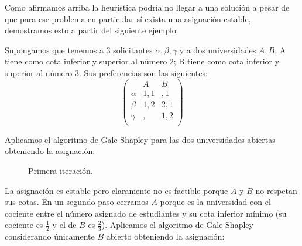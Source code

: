 Como afirmamos arriba la heurística podría no llegar a una solución a pesar de que para ese problema en particular sí exista una asignación estable, demostramos esto a partir del siguiente ejemplo. 

\begin{eje} \cite{Todo}
Supongamos que tenemos a 3 solicitantes $\alpha,\beta,\gamma$ y a dos universidades $A,B$. A tiene como cota inferior y superior al número 2; B tiene como cota inferior y superior al número 3. Sus preferencias son las siguientes:
$$\begin{pmatrix}
& A & B \\
\alpha & 1,1 & ,1 \\
\beta & 1,2 & 2,1 \\ 
\gamma & , & 1,2 \\ 
\end{pmatrix}$$

Aplicamos el algoritmo de Gale Shapley para las dos universidades abiertas obteniendo la asignación:
\begin{figure}[H]\centering


\caption{Primera iteración.}
\end{figure}

La asignación es estable pero claramente no es factible porque $A$ y $B$ no respetan sus cotas. En un segundo paso cerramos $A$ porque es la universidad con el cociente entre el número asignado de estudiantes y su cota inferior mínimo (su cociente es $\frac{1}{2}$ y el de $B$ es $\frac{2}{3}$). Aplicamos el algoritmo de Gale Shapley considerando únicamente $B$ abierto obteniendo la asignación:


\end{eje}
